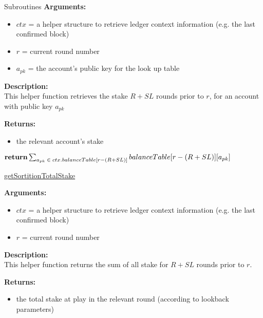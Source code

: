 \documentclass[10pt,a4paper]{article}
\begin{document}
\begin{section}{Subroutines}
\noindent \textbf{Arguments:}
\begin{itemize}
    \item $ctx$ = a helper structure to retrieve ledger context information (e.g. the last confirmed block)
    \item $r$ = current round number
    \item $a_{pk}$ = the account's public key for the look up table
  \end{itemize}


\noindent \textbf{Description:}\\
This helper function retrieves the stake $R + SL$ rounds prior to $r$, for an account
with public key $a_{pk}$

\noindent \textbf{Returns:}
\begin{itemize}
    \item the relevant account's stake
  \end{itemize}




\begin{algorithm}[H]
    \begin{algorithmic}[H]
        
        $\Return \sum_{a_{pk}\;\in\;ctx.balanceTable[r - (R + SL)]}{balanceTable[r - (R + SL)][a_{pk}]}$

        \EndFunction
    \end{algorithmic}
    \caption{\underline{getSortitionTotalStake}}
\end{algorithm}

\noindent \textbf{Arguments:}
\begin{itemize}
    \item $ctx$ = a helper structure to retrieve ledger context information (e.g. the last confirmed block)
    \item $r$ = current round number
  \end{itemize}


\noindent \textbf{Description:}\\
This helper function returns the sum of all stake for $R + SL$ rounds prior to $r$.

\noindent \textbf{Returns:}
\begin{itemize}
    \item the total stake at play in the relevant round (according to lookback parameters)
  \end{itemize}


\end{section}
\end{document}
